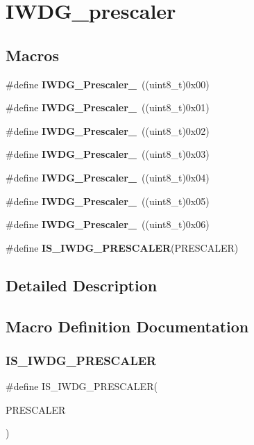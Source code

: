 \section{I\+W\+D\+G\+\_\+prescaler}
\label{group__IWDG__prescaler}
\subsection*{Macros}
\begin{DoxyCompactItemize}
\item 
\#define \textbf{ I\+W\+D\+G\+\_\+\+Prescaler\+\_}~((uint8\+\_\+t)0x00)
\item 
\#define \textbf{ I\+W\+D\+G\+\_\+\+Prescaler\+\_}~((uint8\+\_\+t)0x01)
\item 
\#define \textbf{ I\+W\+D\+G\+\_\+\+Prescaler\+\_}~((uint8\+\_\+t)0x02)
\item 
\#define \textbf{ I\+W\+D\+G\+\_\+\+Prescaler\+\_}~((uint8\+\_\+t)0x03)
\item 
\#define \textbf{ I\+W\+D\+G\+\_\+\+Prescaler\+\_}~((uint8\+\_\+t)0x04)
\item 
\#define \textbf{ I\+W\+D\+G\+\_\+\+Prescaler\+\_}~((uint8\+\_\+t)0x05)
\item 
\#define \textbf{ I\+W\+D\+G\+\_\+\+Prescaler\+\_}~((uint8\+\_\+t)0x06)
\item 
\#define \textbf{ I\+S\+\_\+\+I\+W\+D\+G\+\_\+\+P\+R\+E\+S\+C\+A\+L\+ER}(P\+R\+E\+S\+C\+A\+L\+ER)
\end{DoxyCompactItemize}


\subsection{Detailed Description}


\subsection{Macro Definition Documentation}
\mbox{\label{group__IWDG__prescaler_gab1e0695c1a22840d5be7c7fad283f4ba}} 
\subsubsection{I\+S\+\_\+\+I\+W\+D\+G\+\_\+\+P\+R\+E\+S\+C\+A\+L\+ER}
{\footnotesize\ttfamily \#define I\+S\+\_\+\+I\+W\+D\+G\+\_\+\+P\+R\+E\+S\+C\+A\+L\+ER(\begin{DoxyParamCaption}\item[{}]{P\+R\+E\+S\+C\+A\+L\+ER }\end{DoxyParamCaption})}

